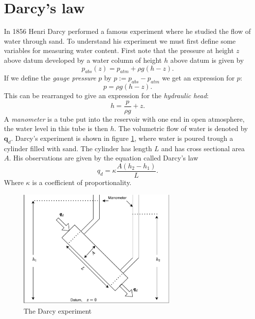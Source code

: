 \documentclass[../Main/main.tex]{subfiles}
\begin{document}
\section*{Darcy's law}
In 1856 Henri Darcy performed a famous experiment where he studied the flow of water through sand. To understand his experiment we must first define some variables for measuring water content. First note that the pressure at height $z$ above datum developed by a water column of height $h$ above datum is given by
\begin{equation*}
p_{abs}(z) = p_{atm} + \rho g(h-z).
\end{equation*}
If we define the \emph{gauge pressure} $p$ by $p := p_{abs}-p_{atm}$ we get an expression for $p$:
\begin{equation*}
p = \rho g(h-z).
\end{equation*}
This can be rearranged to give an expression for the \emph{hydraulic head}:
\begin{equation}\label{eq:hydraulic}
h = \frac{p}{\rho g} + z.
\end{equation}
A \emph{manometer} is a tube put into the reservoir with one end in open atmosphere, the water level in this tube is then $h$. The volumetric flow of water is denoted by $\textbf{q}_d$. Darcy's experiment is shown in figure \ref{fig:darcy}, where water is poured trough a cylinder filled with sand. The cylinder has length $L$ and has cross sectional area $A$. His observations are given by the equation called Darcy's law
\begin{equation}
q_d = \kappa \frac{A(h_2-h_1)}{L}.
\end{equation}
Where $\kappa$ is a coefficient of proportionality.
\begin{figure}[h]
\centering
\includegraphics[width=0.7\textwidth]{Darcy experiment.pdf}
\caption{The Darcy experiment}
\label{fig:darcy}
\end{figure}
\end{document}
